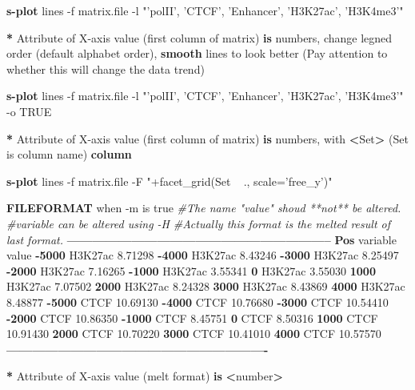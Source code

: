 \documentclass[]{article}
\newenvironment{Shaded}{\begin{snugshade}}{\end{snugshade}}
\newcommand{\KeywordTok}[1]{\textcolor[rgb]{0.13,0.29,0.53}{\textbf{{#1}}}}
\newcommand{\StringTok}[1]{\textcolor[rgb]{0.31,0.60,0.02}{{#1}}}
\newcommand{\CommentTok}[1]{\textcolor[rgb]{0.56,0.35,0.01}{\textit{{#1}}}}
\newcommand{\NormalTok}[1]{{#1}}
\numberwithin{figure}{section}
\numberwithin{table}{section}
\theoremstyle{definition}
\theoremstyle{definition}
\theoremstyle{definition}
\theoremstyle{remark}
\begin{document}
\begin{Shaded}
\begin{Highlighting}[]
    \KeywordTok{s-plot} \NormalTok{lines -f matrix.file -l }\StringTok{"'polII', 'CTCF', 'Enhancer', 'H3K27ac', 'H3K4me3'"}

\KeywordTok{*} \NormalTok{Attribute of X-axis value (first column of matrix) }\KeywordTok{is} \NormalTok{numbers, change legned order (default alphabet order), }\KeywordTok{smooth} \NormalTok{lines to look better (Pay attention to whether this will change the data trend)}

    \KeywordTok{s-plot} \NormalTok{lines -f matrix.file -l }\StringTok{"'polII', 'CTCF', 'Enhancer', 'H3K27ac', 'H3K4me3'"} \NormalTok{-o TRUE}

\KeywordTok{*} \NormalTok{Attribute of X-axis value (first column of matrix) }\KeywordTok{is} \NormalTok{numbers, with }\KeywordTok{<}\NormalTok{Set}\KeywordTok{>} \NormalTok{(Set is column name) }\KeywordTok{column}
    
    \KeywordTok{s-plot} \NormalTok{lines -f matrix.file -F }\StringTok{"+facet_grid(Set ~ ., scale='free_y')"}


\KeywordTok{FILEFORMAT} \NormalTok{when -m is true}
\CommentTok{#The name "value" shoud **not** be altered.}
\CommentTok{#variable can be altered using -H}
\CommentTok{#Actually this format is the melted result of last format.}
\KeywordTok{--------------------------------------------------------------}
\KeywordTok{Pos} \NormalTok{variable    value}
\KeywordTok{-5000}   \NormalTok{H3K27ac 8.71298}
\KeywordTok{-4000}   \NormalTok{H3K27ac 8.43246}
\KeywordTok{-3000}   \NormalTok{H3K27ac 8.25497}
\KeywordTok{-2000}   \NormalTok{H3K27ac 7.16265}
\KeywordTok{-1000}   \NormalTok{H3K27ac 3.55341}
\KeywordTok{0}   \NormalTok{H3K27ac 3.55030}
\KeywordTok{1000}    \NormalTok{H3K27ac 7.07502}
\KeywordTok{2000}    \NormalTok{H3K27ac 8.24328}
\KeywordTok{3000}    \NormalTok{H3K27ac 8.43869}
\KeywordTok{4000}    \NormalTok{H3K27ac 8.48877}
\KeywordTok{-5000}   \NormalTok{CTCF    10.69130}
\KeywordTok{-4000}   \NormalTok{CTCF    10.76680}
\KeywordTok{-3000}   \NormalTok{CTCF    10.54410}
\KeywordTok{-2000}   \NormalTok{CTCF    10.86350}
\KeywordTok{-1000}   \NormalTok{CTCF    8.45751}
\KeywordTok{0}   \NormalTok{CTCF    8.50316}
\KeywordTok{1000}    \NormalTok{CTCF    10.91430}
\KeywordTok{2000}    \NormalTok{CTCF    10.70220}
\KeywordTok{3000}    \NormalTok{CTCF    10.41010}
\KeywordTok{4000}    \NormalTok{CTCF    10.57570}
\KeywordTok{-------------------------------------------------------------}

\KeywordTok{*} \NormalTok{Attribute of X-axis value (melt format) }\KeywordTok{is} \KeywordTok{<}\NormalTok{number}\KeywordTok{>}


\end{Highlighting}
\end{Shaded}
\end{document}
